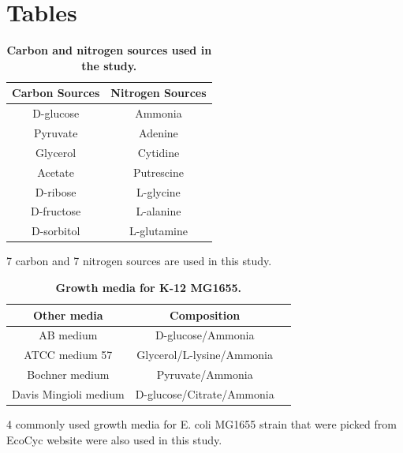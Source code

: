 \documentclass[12pt]{article}
\begin{document}
\section*{Tables}
\begin{table}[!ht]
\caption{
\bf{Carbon and nitrogen sources used in the study.}}
\begin{tabular}{|c|c|}
\hline \hline
Carbon Sources & Nitrogen Sources \\
\hline
D-glucose & Ammonia \\
Pyruvate & Adenine \\
Glycerol & Cytidine \\
Acetate & Putrescine \\
D-ribose & L-glycine \\
D-fructose & L-alanine \\
D-sorbitol & L-glutamine \\
\hline
\end{tabular}
\begin{flushleft} 7 carbon and 7 nitrogen sources are used in this study.
\end{flushleft}
\label{tab:label}
 \end{table}


\begin{table}[!ht]
\caption{
\bf{Growth media for K-12 MG1655.}}
\begin{tabular}{|c|c|c|}
\hline \hline
Other media & Composition \\
\hline
AB medium &  D-glucose/Ammonia\\
ATCC medium 57 &  Glycerol/L-lysine/Ammonia\\
Bochner medium &  Pyruvate/Ammonia\\
Davis Mingioli medium & D-glucose/Citrate/Ammonia\\
\hline
\end{tabular}
\begin{flushleft}4 commonly used growth media for E. coli MG1655 strain that were picked from EcoCyc website were also used in this study.
\end{flushleft}
\label{tab:label}
 \end{table}
\end{document}
